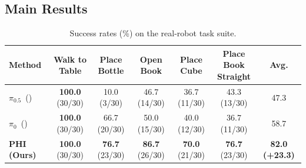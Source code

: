 \documentclass{article} %
\begin{document}
\subsection{Main Results}
\label{sec:main_results}

\begin{table}[ht]
\centering
\small
\renewcommand{\arraystretch}{1.05}
\setlength{\tabcolsep}{2pt}
\caption{
Success rates (\%) on the real-robot task suite.
}
\label{tab:main_results}
\begin{tabular}{lcccccc}
\toprule
\textbf{Method} & \shortstack{\textbf{Walk to}\\\textbf{Table}} & \shortstack{\textbf{Place}\\\textbf{Bottle}} & \shortstack{\textbf{Open}\\\textbf{Book}} & \shortstack{\textbf{Place}\\\textbf{Cube}} & \shortstack{\textbf{Place Book}\\\textbf{Straight}} & \textbf{Avg.} \\
\midrule
$\pi_{0.5}$~{\scriptsize(\citealp{black2025pi05})} & \textbf{100.0} {\scriptsize(30/30)} & 10.0 {\scriptsize(3/30)} & 46.7 {\scriptsize(14/30)} & 36.7 {\scriptsize(11/30)} & 43.3 {\scriptsize(13/30)} & 47.3 \\
$\pi_0$~{\scriptsize(\citealp{black2024pi0})} & \textbf{100.0} {\scriptsize(30/30)} & 66.7 {\scriptsize(20/30)} & 50.0 {\scriptsize(15/30)} & 40.0 {\scriptsize(12/30)} & 36.7 {\scriptsize(11/30)} & 58.7 \\
\midrule
\rowcolor{gray!15}
\textbf{PHI (Ours)} & \textbf{100.0} {\scriptsize(30/30)} & \textbf{76.7} {\scriptsize(23/30)} & \textbf{86.7} {\scriptsize(26/30)} & \textbf{70.0} {\scriptsize(21/30)} & \textbf{76.7} {\scriptsize(23/30)} & \textbf{82.0} {\color{green!50!black}\textbf{(+23.3)}} \\
\bottomrule
\end{tabular}
\end{table}


\end{document}
